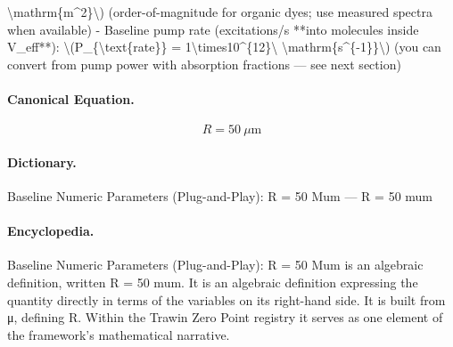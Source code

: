 \textbackslash{}mathrm\{m\textasciicircum{}2\}\textbackslash{}) (order-of-magnitude for organic dyes; use measured spectra when available) - Baseline pump rate (excitations/s **into molecules inside V\_eff**): \textbackslash{}(P\_\{\textbackslash{}text\{rate\}\} = 1\textbackslash{}times10\textasciicircum{}\{12\}\textbackslash{} \textbackslash{}mathrm\{s\textasciicircum{}\{-1\}\}\textbackslash{}) (you can convert from pump power with absorption fractions — see next section)

\paragraph{Canonical Equation.}
\[
R = 50\ \mu\text{m}
\]

\paragraph{Dictionary.}
Baseline Numeric Parameters (Plug-and-Play): R = 50 Mum — R = 50 mum

\paragraph{Encyclopedia.}
Baseline Numeric Parameters (Plug-and-Play): R = 50 Mum is an algebraic definition, written R = 50 mum. It is an algebraic definition expressing the quantity directly in terms of the variables on its right-hand side. It is built from μ, defining R. Within the Trawin Zero Point registry it serves as one element of the framework's mathematical narrative.
